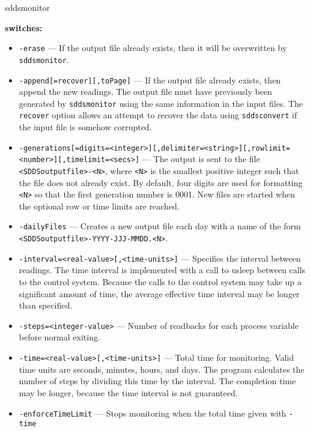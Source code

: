\begin{sddsprog}{sddsmonitor}
%
\item {\bf switches:}
%
%
    \begin{itemize}
        \item {\tt -erase} --- If the output file already exists, then it will be overwritten
                by \verb+sddsmonitor+.
        \item {\tt -append[=recover][,toPage]} --- If the output file already exists, then append the new readings.
                The output file must have previously been generated by \verb+sddsmonitor+ using the same
                information in the input files. The \verb+recover+ option allows an attempt
                to recover the data using \verb+sddsconvert+ if the input file is somehow corrupted.
        \item {\verb+-generations[=digits=<integer>][,delimiter=<string>][,rowlimit=<number>][,timelimit=<secs>]+} ---
                The output is sent to the file \verb+<SDDSoutputfile>-<N>+, where \verb+<N>+
                is the smallest positive integer such that the file does not already
                exist. By default, four digits are used for formatting \verb+<N>+ so that
                the first generation number is 0001. New files are started when the
                optional row or time limits are reached.
        \item {\tt -dailyFiles} --- Creates a new output file each day with a name
                of the form \verb+<SDDSoutputfile>-YYYY-JJJ-MMDD.<N>+.
        \item {\tt -interval=<real-value>[,<time-units>]} --- Specifies the interval between readings. The time
                interval is implemented with a call to usleep between calls to the control system.
                Because the calls to the control system may take up a significant amount of time, the average
                effective time interval may be longer than specified.
        \item {\tt -steps=<integer-value>} --- Number of readbacks for each process variable before normal exiting.
        \item {\tt -time=<real-value>[,<time-units>]} --- Total time for monitoring. Valid time units are
                seconds, minutes, hours, and days. The program calculates the number of steps by dividing this time
                by the interval. The completion time may be longer, because the time interval is not guaranteed.
        \item {\tt -enforceTimeLimit} --- Stops monitoring when the total time given with \verb+-time+

\end{itemize}
\end{sddsprog}
